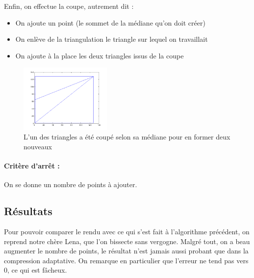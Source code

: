 \documentclass{report}
\begin{document}
Enfin, on effectue la coupe, autrement dit :
\begin{itemize}
	\item On ajoute un point (le sommet de la médiane qu'on doit créer)
	\item On enlève de la triangulation le triangle sur lequel on travaillait
	\item On ajoute à la place les deux triangles issus de la coupe
\end{itemize}


\begin{figure}[ht]
\centering
\includegraphics[width=0.4\textwidth]{beginBissect2.png}
\caption{L'un des triangles a été coupé selon sa médiane pour en former deux nouveaux}
\end{figure}

\paragraph{Critère d'arrêt :}
On se donne un nombre de points à ajouter.

\subsection{Résultats}

Pour pouvoir comparer le rendu avec ce qui s'est fait à l'algorithme précédent, on reprend notre chère Lena, que l'on bissecte sans vergogne. Malgré tout, on a beau augmenter le nombre de points, le résultat n'est jamais aussi probant que dans la compression adaptative. On remarque en particulier que l'erreur ne tend pas vers 0, ce qui est fâcheux.
\end{document}
